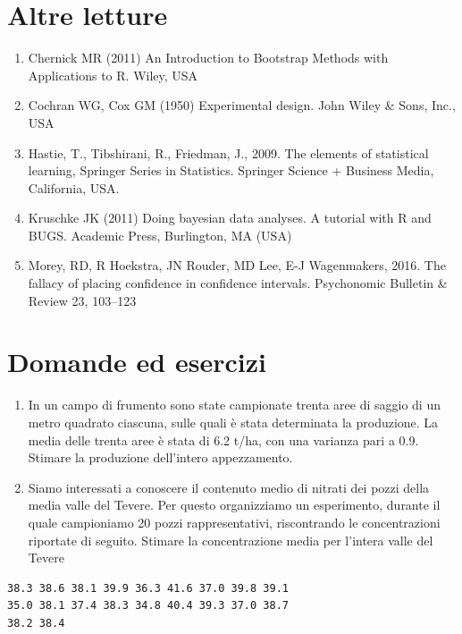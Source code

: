 \documentclass[
  12pt,
]{book}
\providecommand{\tightlist}{%
  \setlength{\itemsep}{0pt}\setlength{\parskip}{0pt}}
\begin{document}
\hypertarget{altre-letture-5}{%
\section{Altre letture}\label{altre-letture-5}}

\begin{enumerate}
\def\labelenumi{\arabic{enumi}.}
\tightlist
\item
  Chernick MR (2011) An Introduction to Bootstrap Methods with Applications to R. Wiley, USA
\item
  Cochran WG, Cox GM (1950) Experimental design. John Wiley \& Sons, Inc., USA
\item
  Hastie, T., Tibshirani, R., Friedman, J., 2009. The elements of statistical learning, Springer Series in Statistics. Springer Science + Business Media, California, USA.
\item
  Kruschke JK (2011) Doing bayesian data analyses. A tutorial with R and BUGS. Academic Press, Burlington, MA (USA)
\item
  Morey, RD, R Hoekstra, JN Rouder, MD Lee, E-J Wagenmakers, 2016. The fallacy of placing confidence in confidence intervals. Psychonomic Bulletin \& Review 23, 103--123
\end{enumerate}

\hypertarget{domande-ed-esercizi-4}{%
\section{Domande ed esercizi}\label{domande-ed-esercizi-4}}

\begin{enumerate}
\def\labelenumi{\arabic{enumi}.}
\tightlist
\item
  In un campo di frumento sono state campionate trenta aree di saggio di un metro quadrato ciascuna, sulle quali è stata determinata la produzione. La media delle trenta aree è stata di 6.2 t/ha, con una varianza pari a 0.9. Stimare la produzione dell'intero appezzamento.
\item
  Siamo interessati a conoscere il contenuto medio di nitrati dei pozzi della media valle del Tevere. Per questo organizziamo un esperimento, durante il quale campioniamo 20 pozzi rappresentativi, riscontrando le concentrazioni riportate di seguito. Stimare la concentrazione media per l'intera valle del Tevere
\end{enumerate}

\begin{verbatim}
38.3 38.6 38.1 39.9 36.3 41.6 37.0 39.8 39.1     
35.0 38.1 37.4 38.3 34.8 40.4 39.3 37.0 38.7    
38.2 38.4    
\end{verbatim}
\end{document}

